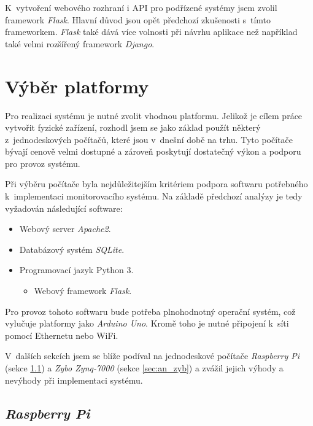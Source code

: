 K~vytvoření webového rozhraní i API pro podřízené systémy jsem zvolil framework \textit{Flask}. Hlavní důvod jsou opět předchozí zkušenosti s~tímto frameworkem. \textit{Flask} také dává více volnosti při návrhu aplikace než například také velmi rozšířený framework \textit{Django}.

\section{Výběr platformy}
\label{sec:an_plat}

Pro realizaci systému je nutné zvolit vhodnou platformu. Jelikož je cílem práce vytvořit fyzické zařízení, rozhodl jsem se jako základ použít některý z~jednodeskových počítačů, které jsou v~dnešní době na trhu. Tyto počítače bývají cenově velmi dostupné a zároveň poskytují dostatečný výkon a podporu pro provoz systému.

Při výběru počítače byla nejdůležitejším kritériem podpora softwaru potřebného k~implementaci monitorovacího systému. Na základě předchozí analýzy je tedy vyžadován následující software:

\begin{itemize}
    \item Webový server \textit{Apache2}.
    \item Databázový systém \textit{SQLite}.
    \item Programovací jazyk Python 3.
    \begin{itemize}
        \item Webový framework \textit{Flask}.
    \end{itemize}
\end{itemize}

Pro provoz tohoto softwaru bude potřeba plnohodnotný operační systém, což vylučuje platformy jako \textit{Arduino Uno}. Kromě toho je nutné připojení k~síti pomocí Ethernetu nebo WiFi. 

V~dalších sekcích jsem se blíže podíval na jednodeskové počítače \textit{Raspberry Pi} (sekce \ref{sec:an_rpi}) a \textit{Zybo Zynq-7000} (sekce \ref{sec:an_zyb}) a zvážil jejich výhody a nevýhody při implementaci systému.

\subsection{\textit{Raspberry Pi}}
\label{sec:an_rpi}


